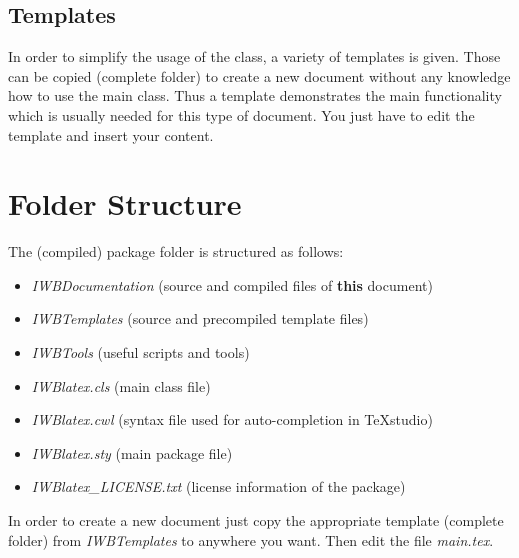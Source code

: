 \subsection{Templates}%
\label{sec:frontmatter_templates}%
In order to simplify the usage of the class, a variety of templates is given. Those can be copied (complete folder) to create a new document without any knowledge how to use the main class. Thus a template demonstrates the main functionality which is usually needed for this type of document. You just have to edit the template and insert your content.\par%
%
%
\section{Folder Structure}%
The (compiled) package folder is structured as follows:\par%
%
\begin{itemize}\itemsep0pt%
    \item \textit{IWBDocumentation} (source and compiled files of \textbf{this} document)
    \item \textit{IWBTemplates} (source and precompiled template files)
    \item \textit{IWBTools} (useful scripts and tools)
    \item \textit{IWBlatex.cls} (main class file)
    \item \textit{IWBlatex.cwl} (syntax file used for auto-completion in TeXstudio)
    \item \textit{IWBlatex.sty} (main package file)
    \item \textit{IWBlatex\_LICENSE.txt} (license information of the package)
\end{itemize}%
%
In order to create a new document just copy the appropriate template (complete folder) from \textit{IWBTemplates} to anywhere you want. Then edit the file \textit{main.tex}.\par%
%
%
